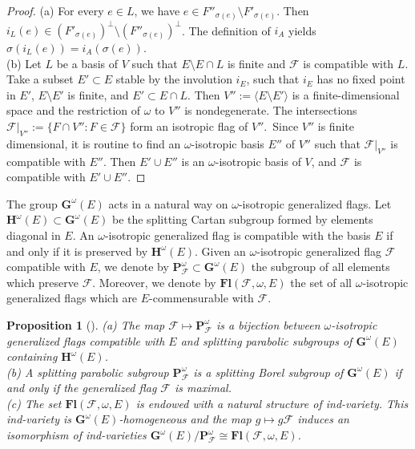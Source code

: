 \documentclass[12pt]{amsart}
\newtheorem{proposition}{Proposition}
\theoremstyle{definition}
\begin{document}
\begin{proof}
{\rm (a)} For every $e\in L$, we have $e\in F''_{\sigma(e)}\setminus F'_{\sigma(e)}$. Then $i_L(e)\in (F'_{\sigma(e)})^\perp\setminus (F''_{\sigma(e)})^\perp$. The definition of $i_A$ yields $\sigma(i_L(e))=i_A(\sigma(e))$. \\
{\rm (b)}
Let $L$ be a basis of $V$ such that $E\setminus E\cap L$ is finite and $\mathcal{F}$ is compatible with $L$.
Take a subset $E'\subset E$ stable by the involution $i_E$, such that $i_E$ has no fixed point in $E'$, $E\setminus E'$ is finite, and $E'\subset E\cap L$. Then $V'':=\langle E\setminus E'\rangle$ is a finite-dimensional space and the restriction of $\omega$ to $V''$ is nondegenerate. The intersections $\mathcal{F}|_{V''}:=\{F\cap V'':F\in\mathcal{F}\}$ form an isotropic flag of $V''$.\ Since $V''$ is finite dimensional, it is routine to find an $\omega$-isotropic basis $E''$ of $V''$ such that $\mathcal{F}|_{V''}$ is compatible with $E''$. Then $E'\cup E''$ is an $\omega$-isotropic basis of $V$, and $\mathcal{F}$ is compatible with $E'\cup E''$.
\end{proof}

The group $\mathbf{G}^\omega(E)$ acts in a natural way on $\omega$-isotropic generalized flags.
Let $\mathbf{H}^\omega(E)\subset\mathbf{G}^\omega(E)$ be the splitting Cartan subgroup formed by elements diagonal in $E$.
An $\omega$-isotropic generalized flag is compatible with the basis $E$ if and only if it is preserved by $\mathbf{H}^\omega(E)$.
Given an $\omega$-isotropic generalized flag $\mathcal{F}$ compatible with $E$,
we denote by $\mathbf{P}_\mathcal{F}^\omega\subset\mathbf{G}^\omega(E)$ the subgroup of all elements which preserve $\mathcal{F}$.
Moreover, we denote by $\mathbf{Fl}(\mathcal{F},\omega,E)$ the set of all $\omega$-isotropic generalized flags which are $E$-commensurable with $\mathcal{F}$.

\begin{proposition}[\cite{DP1,DP}]
\label{proposition-3-new}
{\rm (a)} The map $\mathcal{F}\mapsto
\mathbf{P}_\mathcal{F}^\omega$ is a bijection between $\omega$-isotropic generalized flags compatible with $E$ and splitting parabolic subgroups of $\mathbf{G}^\omega(E)$ containing $\mathbf{H}^\omega(E)$. \\
{\rm (b)} A splitting parabolic subgroup $\mathbf{P}_\mathcal{F}^\omega$ is a splitting Borel subgroup of $\mathbf{G}^\omega(E)$ if and only if the generalized flag $\mathcal{F}$ is maximal. \\
{\rm (c)} The set $\mathbf{Fl}(\mathcal{F},\omega,E)$ is endowed with a natural structure of ind-variety. This ind-variety is $\mathbf{G}^\omega(E)$-homogeneous and the map $g\mapsto g\mathcal{F}$ induces an isomorphism of ind-varieties $\mathbf{G}^\omega(E)/\mathbf{P}^\omega_\mathcal{F}\cong \mathbf{Fl}(\mathcal{F},\omega,E)$.
\end{proposition}
\end{document}
